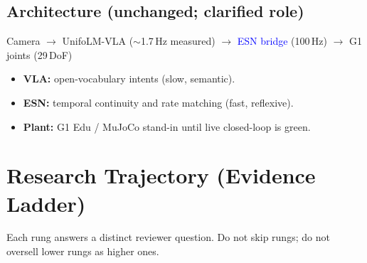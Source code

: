 \documentclass[conference]{IEEEtran}
\begin{document}
\subsection{Architecture (unchanged; clarified role)}
\begin{center}
Camera $\to$ UnifoLM-VLA ($\sim$1.7\,Hz measured) $\to$ \textcolor{blue}{ESN bridge} (100\,Hz) $\to$ G1 joints (29\,DoF)
\end{center}
\begin{itemize}
    \item \textbf{VLA:} open-vocabulary intents (slow, semantic).
    \item \textbf{ESN:} temporal continuity and rate matching (fast, reflexive).
    \item \textbf{Plant:} G1 Edu / MuJoCo stand-in until live closed-loop is green.
\end{itemize}

\section{Research Trajectory (Evidence Ladder)}
\noindent
Each rung answers a distinct reviewer question. Do not skip rungs; do not oversell lower rungs as higher ones.
\end{document}
